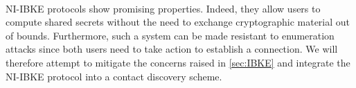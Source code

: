 \paragraph{} NI-IBKE protocols show promising properties. Indeed, they allow users to compute shared secrets without the need to exchange cryptographic material out of bounds. Furthermore, such a system can be made resistant to enumeration attacks since both users need to take action to establish a connection. We will therefore attempt to mitigate the concerns raised in \autoref{sec:IBKE} and integrate the NI-IBKE protocol into a contact discovery scheme.














